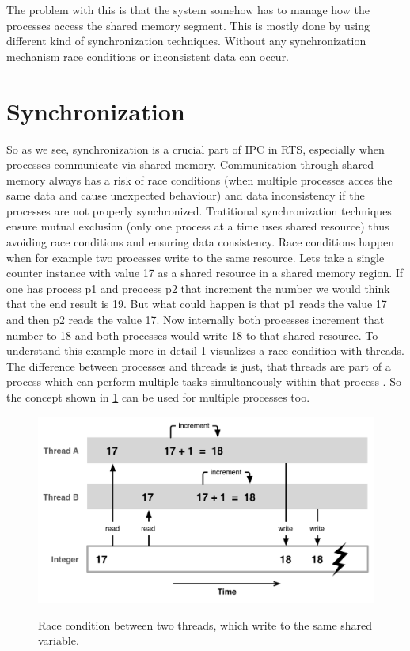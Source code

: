 The problem with this is that the system somehow has to manage how the processes access the shared memory segment. This is mostly done by using different kind of synchronization techniques. Without any synchronization mechanism race conditions or inconsistent data can occur. \cite{IPCMechanisms, SharedMemory}

\section{Synchronization}\label{sec:synchronization}

So as we see, synchronization is a crucial part of \ac{IPC} in \ac{RTS}, especially when processes communicate via shared memory. Communication through shared memory always has a risk of race conditions (when multiple processes acces the same data and cause unexpected behaviour) and data inconsistency if the processes are not properly synchronized. Tratitional synchronization techniques ensure mutual exclusion (only one process at a time uses shared resource) thus avoiding race conditions and ensuring data consistency. Race conditions happen when for example two processes write to the same resource. Lets take a single counter instance with value 17 as a shared resource in a shared memory region. If one has process p1 and preocess p2 that increment the number we would think that the end result is 19. But what could happen is that p1 reads the value 17 and then p2 reads the value 17. Now internally both processes increment that number to 18 and both processes would write 18 to that shared resource. To understand this example more in detail \cref{fig:race-condition} visualizes a race condition with threads. The difference between processes and threads is just, that threads are part of a process which can perform multiple tasks simultaneously within that process \cite{DiffProcessThread}. So the concept shown in \cref{fig:race-condition} can be used for multiple processes too.

\begin{figure}[!ht]
    \centering
    \captionsetup{justification=centering}
    \caption{Race condition between two threads, which write to the same shared variable.}
    \includegraphics[width=115mm]{images/race-condition.png}
    \cite{Race-Condition}
    \label{fig:race-condition}
\end{figure}

